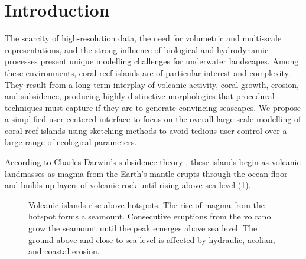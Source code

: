 \section{Introduction}
\label{sec:coral-island-introduction}


The scarcity of high-resolution data, the need for volumetric and multi-scale representations, and the strong influence of biological and hydrodynamic processes present unique modelling challenges for underwater landscapes. Among these environments, coral reef islands are of particular interest and complexity. They result from a long-term interplay of volcanic activity, coral growth, erosion, and subsidence, producing highly distinctive morphologies that procedural techniques must capture if they are to generate convincing seascapes. We propose a simplified user-centered interface to focus on the overall large-scale modelling of coral reef islands using sketching methods to avoid tedious user control over a large range of ecological parameters.

According to Charles Darwin's subsidence theory \cite{Darwin1842}, these islands begin as volcanic landmasses as magma from the Earth's mantle erupts through the ocean floor and builds up layers of volcanic rock until rising above sea level (\cref{fig:coral-island-island-growth}). 

\begin{figure}[tb]
    \caption[Volcanic island formation process]{Volcanic islands rise above hotspots. The rise of magma from the hotspot forms a seamount. Consecutive eruptions from the volcano grow the seamount until the peak emerges above sea level. The ground above and close to sea level is affected by hydraulic, aeolian, and coastal erosion.}
    \label{fig:coral-island-island-growth}
\end{figure}

